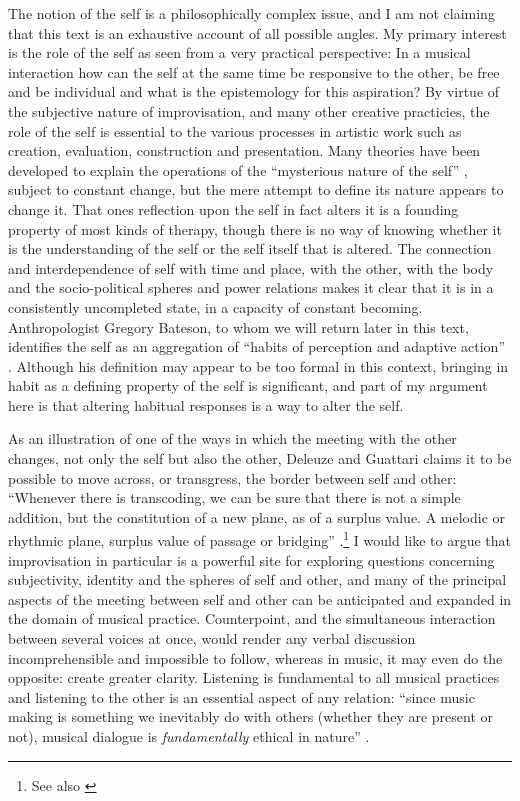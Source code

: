 \documentclass[a4paper]{article}
\begin{document}
The notion of the self is a philosophically complex issue, and I am not claiming that this text is an exhaustive account of all possible angles. My primary interest is the role of the self as seen from a very practical perspective: In a musical interaction how can the self at the same time be responsive to the other, be free and be individual and what is the epistemology for this aspiration?
By virtue of the subjective nature of improvisation, and many other creative practicies, the role of the self is essential to the various processes in artistic work such as creation, evaluation, construction and presentation. Many theories have been developed to explain the operations of the ``mysterious nature of the self'' \citep[][p. 167]{griffiths10}, subject to constant change, but the mere attempt to define its nature appears to change it. That ones reflection upon the self in fact alters it is a founding property of most kinds of therapy, though there is no way of knowing whether it is the understanding of the self or the self itself that is altered. The connection and interdependence of self with time and place, with the other, with the body and the socio-political spheres and power relations makes it clear that it is in a consistently uncompleted state, in a capacity of constant becoming. Anthropologist Gregory Bateson, to whom we will return later in this text, identifies the self as an aggregation of ``habits of perception and adaptive action'' \citep[p. 242]{bateson72:steps}. Although his definition may appear to be too formal in this context, bringing in habit as a defining property of the self is significant, and part of my argument here is that altering habitual responses is a way to alter the self. 


As an illustration of one of the ways in which the meeting with the other changes, not only the self but also the other, Deleuze and Guattari claims it to be possible to move across, or transgress, the border between self and other: ``Whenever there is transcoding, we can be sure that there is not a simple addition, but the constitution of a new plane, as of a surplus value. A melodic or rhythmic plane, surplus value of passage or bridging'' \citep[p. 346]{deleuze80}.\footnote{See also \citep[][p. 140]{semetsky2011}} I would like to argue that improvisation in particular is a powerful site for exploring questions concerning subjectivity, identity and the spheres of self and other, and many of the principal aspects of the meeting between self and other can be anticipated and expanded in the domain of musical practice. Counterpoint, and the simultaneous interaction between several voices at once, would render any verbal discussion incomprehensible and impossible to follow, whereas in music, it may even do the opposite: create greater clarity. Listening is fundamental to all musical practices and listening to the other is an essential aspect of any relation: ``since music making is something we inevitably do with others (whether they are present or not), musical dialogue is \emph{fundamentally} ethical in nature'' \citep[p. 164]{benson03}. 
\end{document}

